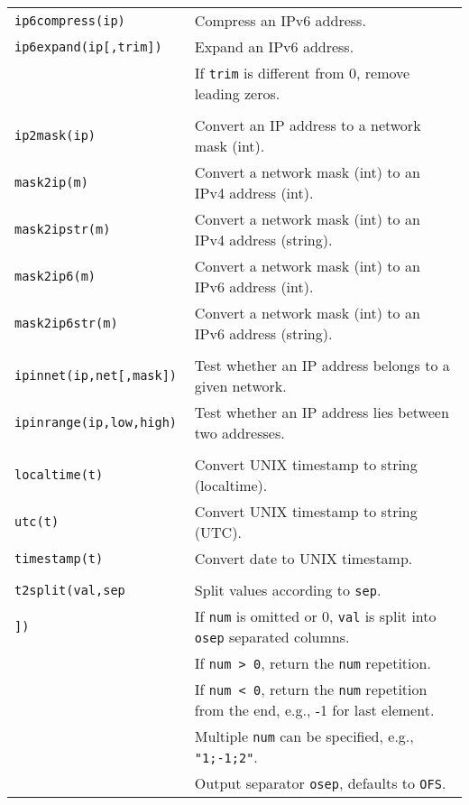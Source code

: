 \documentclass[documentation]{subfiles}
\begin{document}
\begin{longtable}{>{\tt}ll}
    \\
    ip6compress(ip)             & Compress an IPv6 address.\\
    ip6expand(ip[,trim])        & Expand an IPv6 address.\\
                                & If {\tt trim} is different from 0, remove leading zeros.\\
    \\
    ip2mask(ip)                 & Convert an IP address to a network mask (int).\\
    mask2ip(m)                  & Convert a network mask (int) to an IPv4 address (int).\\
    mask2ipstr(m)               & Convert a network mask (int) to an IPv4 address (string).\\
    mask2ip6(m)                 & Convert a network mask (int) to an IPv6 address (int).\\
    mask2ip6str(m)              & Convert a network mask (int) to an IPv6 address (string).\\
    \\
    ipinnet(ip,net[,mask])      & Test whether an IP address belongs to a given network.\\
    ipinrange(ip,low,high)      & Test whether an IP address lies between two addresses.\\
    \\
    localtime(t)                & Convert UNIX timestamp to string (localtime).\\
    utc(t)                      & Convert UNIX timestamp to string (UTC).\\
    timestamp(t)                & Convert date to UNIX timestamp.\\
    \\
    t2split(val,sep             & Split values according to {\tt sep}.\\
    \qquad [,num[,osep]])       & If {\tt num} is omitted or 0, {\tt val} is split into {\tt osep} separated columns.\\
                                & If {\tt num > 0}, return the {\tt num} repetition.\\
                                & If {\tt num < 0}, return the {\tt num} repetition from the end, e.g., -1 for last element.\\
                                & Multiple {\tt num} can be specified, e.g., {\tt "1;-1;2"}.\\
                                & Output separator {\tt osep}, defaults to {\tt OFS}.\\

\end{longtable}
\end{document}
